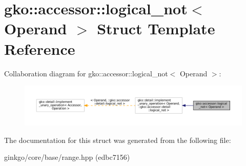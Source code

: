 \hypertarget{structgko_1_1accessor_1_1logical__not}{}\section{gko\+:\+:accessor\+:\+:logical\+\_\+not$<$ Operand $>$ Struct Template Reference}
\label{structgko_1_1accessor_1_1logical__not}


Collaboration diagram for gko\+:\+:accessor\+:\+:logical\+\_\+not$<$ Operand $>$\+:
\nopagebreak
\begin{figure}[H]
\begin{center}
\leavevmode
\includegraphics[width=350pt]{structgko_1_1accessor_1_1logical__not__coll__graph}
\end{center}
\end{figure}


The documentation for this struct was generated from the following file\+:\begin{DoxyCompactItemize}
\item 
ginkgo/core/base/range.\+hpp (edbc7156)\end{DoxyCompactItemize}
